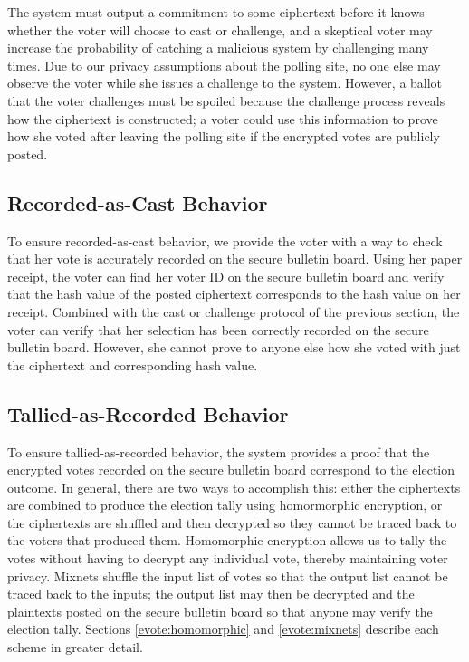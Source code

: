 The system must output a commitment to some ciphertext before it knows whether the voter will choose to cast or challenge, and a skeptical voter may increase the probability of catching a malicious system by challenging many times. Due to our privacy assumptions about the polling site, no one else may observe the voter while she issues a challenge to the system. However, a ballot that the voter challenges must be spoiled because the challenge process reveals how the ciphertext is constructed; a voter could use this information to prove how she voted after leaving the polling site if the encrypted votes are publicly posted.

\subsection{Recorded-as-Cast Behavior} \label{evote:design:recordedascast}

To ensure recorded-as-cast behavior, we provide the voter with a way to check that her vote is accurately recorded on the secure bulletin board. Using her paper receipt, the voter can find her voter ID on the secure bulletin board and verify that the hash value of the posted ciphertext corresponds to the hash value on her receipt. Combined with the cast or challenge protocol of the previous section, the voter can verify that her selection has been correctly recorded on the secure bulletin board. However, she cannot prove to anyone else how she voted with just the ciphertext and corresponding hash value.

\subsection{Tallied-as-Recorded Behavior} \label{evote:design:talliedasrecorded}

To ensure tallied-as-recorded behavior, the system provides a proof that the encrypted votes recorded on the secure bulletin board correspond to the election outcome. In general, there are two ways to accomplish this: either the ciphertexts are combined to produce the election tally using homormorphic encryption, or the ciphertexts are shuffled and then decrypted so they cannot be traced back to the voters that produced them. Homomorphic encryption allows us to tally the votes without having to decrypt any individual vote, thereby maintaining voter privacy. Mixnets shuffle the input list of votes so that the output list cannot be traced back to the inputs; the output list may then be decrypted and the plaintexts posted on the secure bulletin board so that anyone may verify the election tally. Sections \ref{evote:homomorphic} and \ref{evote:mixnets} describe each scheme in greater detail.

